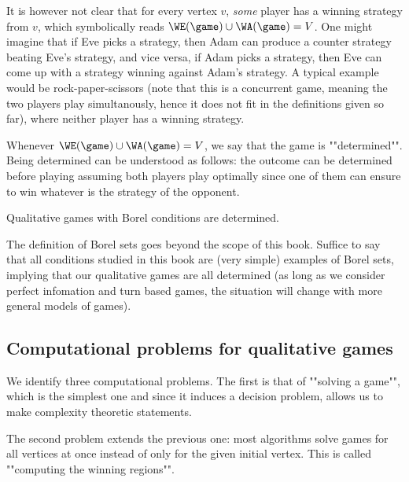 It is however not clear that for every vertex $v$, \textit{some} player has a winning strategy from $v$,
which symbolically reads $\WE(\game) \cup \WA(\game) = V$.
One might imagine that if Eve picks a strategy, then Adam can produce a counter strategy beating Eve's strategy, 
and vice versa, if Adam picks a strategy, then Eve can come up with a strategy winning against Adam's strategy.
A typical example would be rock-paper-scissors (note that this is a concurrent game, meaning the two players play simultanously,
hence it does not fit in the definitions given so far), where neither player has a winning strategy.

Whenever $\WE(\game) \cup \WA(\game) = V$, we say that the game is ""determined"".
Being determined can be understood as follows: the outcome can be determined before playing assuming both players play optimally since one of them can ensure to win whatever is the strategy of the opponent.

\begin{theorem}
\label{1-thm:borel_determinacy}
Qualitative games with Borel conditions are determined.
\end{theorem}

The definition of Borel sets goes beyond the scope of this book. 
Suffice to say that all conditions studied in this book are (very simple) examples of Borel sets,
implying that our qualitative games are all determined 
(as long as we consider perfect infomation and turn based games, the situation will change with more general models of games).

\subsection*{Computational problems for qualitative games}
We identify three computational problems.
The first is that of ""solving a game"", which is the simplest one and since it induces a decision problem, allows us 
to make complexity theoretic statements.


The second problem extends the previous one: most algorithms solve games for all vertices at once instead of only for the given initial vertex.
This is called ""computing the winning regions"".

